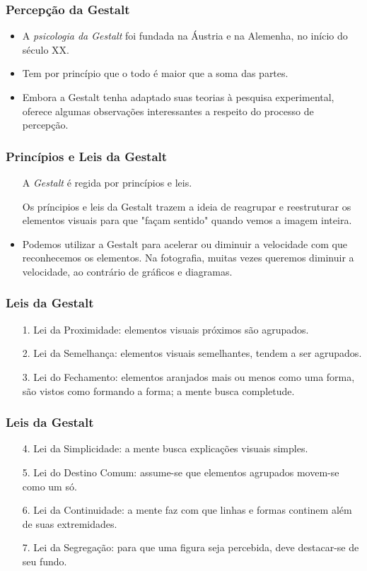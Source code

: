 \begin{frame}
    \frametitle{Percepção da Gestalt}
    \begin{itemize}
      \item A \textit{psicologia da Gestalt} foi fundada na Áustria e na Alemenha,
      no início do século XX.
      \item Tem por princípio que o todo é maior que a soma das partes.
      \item Embora a Gestalt tenha adaptado suas teorias à pesquisa experimental,
      oferece algumas observações interessantes a respeito do processo de percepção.
    \end{itemize}
\end{frame}

\begin{frame}
    \frametitle{Princípios e Leis da Gestalt}
    \begin{itemize}
      \item[] A \textit{Gestalt} é regida por princípios e leis.
      \item[] Os príncipios e leis da Gestalt trazem a ideia de reagrupar e reestruturar
      os elementos visuais para que "façam sentido" quando vemos a imagem inteira.
      \item Podemos utilizar a Gestalt para acelerar ou diminuir a velocidade com que
      reconhecemos os elementos. Na fotografia, muitas vezes queremos diminuir a
      velocidade, ao contrário de gráficos e diagramas.
    \end{itemize}
\end{frame}

\begin{frame}
    \frametitle{Leis da Gestalt}
    \begin{itemize}
      \item[1.] Lei da Proximidade: elementos visuais próximos são agrupados.
      \item[2.] Lei da Semelhança: elementos visuais semelhantes, tendem a ser agrupados.
      \item[3.] Lei do Fechamento: elementos aranjados mais ou menos como uma forma,
      são vistos como formando a forma; a mente busca completude.
    \end{itemize}
\end{frame}

\begin{frame}
    \frametitle{Leis da Gestalt}
    \begin{itemize}
      \item[4.] Lei da Simplicidade: a mente busca explicações visuais simples.
      \item[5.] Lei do Destino Comum: assume-se que elementos agrupados movem-se como um só.
      \item[6.] Lei da Continuidade: a mente faz com que linhas e formas continem além de suas extremidades.
      \item[7.] Lei da Segregação: para que uma figura seja percebida, deve destacar-se de seu fundo.
    \end{itemize}
\end{frame}

